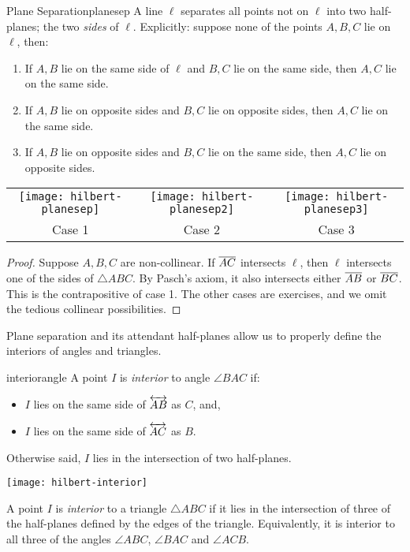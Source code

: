 \begin{thm}{Plane Separation}{planesep}
A line $\ell$ separates all points not on $\ell$ into two half-planes; the two \emph{sides} of $\ell$. Explicitly: suppose none of the points $A,B,C$ lie on $\ell$, then:
\begin{enumerate}\itemsep0pt
  \item If $A,B$ lie on the same side of $\ell$ and $B,C$ lie on the same side, then $A,C$ lie on the same side.
  \item If $A,B$ lie on opposite sides and $B,C$ lie on opposite sides, then $A,C$ lie on the same side.
  \item If $A,B$ lie on opposite sides and $B,C$ lie on the same side, then $A,C$ lie on opposite sides.
\end{enumerate}\vspace{-10pt}
\begin{center}
\begin{tabular}{c@{\qquad}c@{\qquad}c}
\texttt{[image: hilbert-planesep]}
&
\texttt{[image: hilbert-planesep2]}
&
\texttt{[image: hilbert-planesep3]}
\\
Case 1
&
Case 2
&
Case 3
\end{tabular}
\end{center}
\end{thm}

\begin{proof}
Suppose $A,B,C$ are non-collinear. If $\overline{AC}$ intersects $\ell$, then $\ell$ intersects one of the sides of $\triangle ABC$. By Pasch's axiom, it also intersects either $\overline{AB}$ or $\overline{BC}$. This is the contrapositive of case 1.\smallbreak
The other cases are exercises, and we omit the tedious collinear possibilities.
\end{proof}

Plane separation and its attendant half-planes allow us to properly define the interiors of angles and triangles. 

\begin{defn}{}{interiorangle}
A point $I$ is \emph{interior} to angle $\angle BAC$ if:\par
\begin{minipage}[t]{0.7\linewidth}\vspace{-3pt}
\begin{itemize}%
  \item $I$ lies on the same side of $\overleftrightarrow{AB}$ as $C$, and,
  \item $I$ lies on the same side of $\overleftrightarrow{AC}$ as $B$.
\end{itemize}
Otherwise said, $I$ lies in the intersection of two half-planes.
\end{minipage}\begin{minipage}[t]{0.29\linewidth}\vspace{-12pt}
\flushright\texttt{[image: hilbert-interior]}
\end{minipage}\bigbreak
A point $I$ is \emph{interior} to a triangle $\triangle ABC$ if it lies in the intersection of three of the half-planes defined by the edges of the triangle. Equivalently, it is interior to all three of the angles $\angle ABC$, $\angle BAC$ and $\angle ACB$.
\end{defn}

